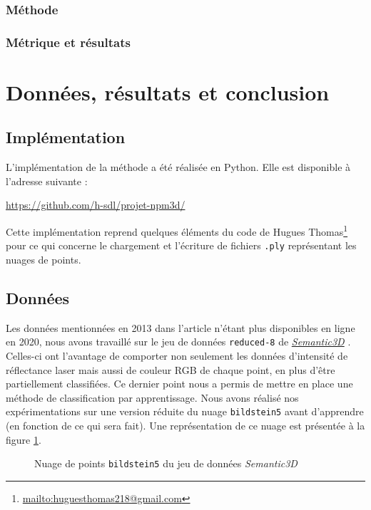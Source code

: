 \documentclass[a4paper, onecolumn, 11pt]{article}
\newcommand{\TODO}{\fbox{\textcolor{red}{TODO}}}
\begin{document}
\subsubsection{Méthode}


\subsubsection{Métrique et résultats}



\section{Données, résultats et conclusion}
\subsection{Implémentation}
L'implémentation de la méthode a été réalisée en Python. Elle est disponible à l'adresse suivante :

\begin{center}
	\url{https://github.com/h-sdl/projet-npm3d/} 
\end{center}

Cette implémentation reprend quelques éléments du code de Hugues Thomas\footnote{\url{mailto:huguesthomas218@gmail.com}} pour ce qui concerne le chargement et l'écriture de fichiers \texttt{.ply} représentant les nuages de points.

\subsection{Données}
Les données mentionnées en 2013 dans l'article \cite{aka_article} n'étant plus disponibles en ligne en 2020, nous avons travaillé sur le jeu de données \texttt{reduced-8} de \href{http://www.semantic3d.net/}{\emph{Semantic3D}} \cite{hackel2017isprs}. Celles-ci ont l'avantage de comporter non seulement les données d'intensité de réflectance laser mais aussi de couleur RGB de chaque point, en plus d'être partiellement classifiées. Ce dernier point nous a permis de mettre en place une méthode de classification par apprentissage.
Nous avons réalisé nos expérimentations sur une version réduite du nuage \texttt{bildstein5} avant d'apprendre (\TODO en fonction de ce qui sera fait).
Une représentation de ce nuage est présentée à la figure \ref{tomate}.

\begin{figure}[h]
\caption{Nuage de points \texttt{bildstein5} du jeu de données \emph{Semantic3D}}
\label{tomate}
\end{figure}

\nocite{*}


\end{document}
